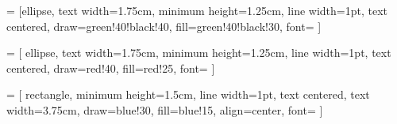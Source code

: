 







\captiontitlefont{\itshape} 
\captionnamefont{\bfseries}




% 

\renewcommand{\arraystretch}{1.50}





\usetikzlibrary{arrows.meta,decorations.markings, fit, positioning}

 = [ellipse,  
    text width=1.75cm,
    minimum height=1.25cm, 
    line width=1pt, 
    text centered, 
    draw=green!40!black!40, 
    fill=green!40!black!30, 
    font=\scriptsize
]

 = [
    ellipse,  
    text width=1.75cm,
    minimum height=1.25cm, 
    line width=1pt, 
    text centered, 
    draw=red!40, 
    fill=red!25, 
    font=\scriptsize
]


 = [
    rectangle, 
    minimum height=1.5cm, 
    line width=1pt, 
    text centered, 
    text width=3.75cm, 
    draw=blue!30, 
    fill=blue!15, 
    align=center,
    font=\linespread{0.9}\scriptsize
]


